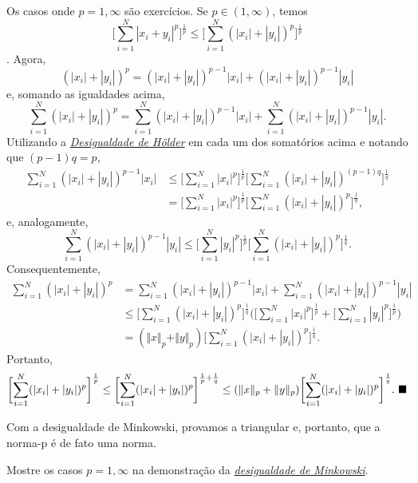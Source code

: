 \documentclass[../functional_analysis.tex]{subfiles}
\begin{document}
\begin{proof*}
	Os casos onde \(p=1, \infty\) são exercícios. Se \(p\in (1, \infty)\), temos
	\[
		\biggl[\sum\limits_{i=1}^{N}|x_{i}+y_{i}|^{p}\biggr]^{\frac{1}{p}} \leq \biggl[\sum\limits_{i=1}^{N}(|x_{i}|+|y_{i}|)^{p}\biggr]^{\frac{1}{p}}
	\].
	Agora,
	\[
		(|x_{i}|+|y_{i}|)^{p} = (|x_{i}|+|y_{i}|)^{p-1}|x_{i}| + (|x_{i}|+|y_{i}|)^{p-1}|y_{i}|
	\]
	e, somando as igualdades acima,
	\[
		\sum\limits_{i=1}^{N}(|x_{i}|+|y_{i}|)^{p} = \sum\limits_{i=1}^{N}(|x_{i}|+|y_{i}|)^{p-1}|x_{i}| + \sum\limits_{i=1}^{N}(|x_{i}|+|y_{i}|)^{p-1}|y_{i}|.
	\]
	Utilizando a \hyperlink{holder_inequality}{\textit{Desigualdade de Hölder}} em cada um dos somatórios acima e notando que \((p-1)q = p\),
	\begin{align*}
		\sum\limits_{i=1}^{N}(|x_{i}|+|y_{i}|)^{p-1}|x_{i}| & \leq \biggl[\sum\limits_{i=1}^{N}|x_{i}|^{p}\biggr]^{\frac{1}{p}}\biggl[\sum\limits_{i=1}^{N}(|x_{i}|+|y_{i}|)^{(p-1)q}\biggr]^{\frac{1}{q}} \\
		                                                    & = \biggl[\sum\limits_{i=1}^{N}|x_{i}|^{p}\biggr]^{\frac{1}{p}}\biggl[\sum\limits_{i=1}^{N}(|x_{i}|+|y_{i}|)^{p}\biggr]^{\frac{1}{q}},
	\end{align*}
	e, analogamente,
	\[
		\sum\limits_{i=1}^{N}(|x_{i}|+|y_{i}|)^{p-1}|y_{i}| \leq \biggl[\sum\limits_{i=1}^{N}|y_{i}|^{p}\biggr]^{\frac{1}{p}}\biggl[\sum\limits_{i=1}^{N}(|x_{i}|+|y_{i}|)^{p}\biggr]^{\frac{1}{q}}.
	\]
	Consequentemente,
	\begin{align*}
		\sum\limits_{i=1}^{N}(|x_{i}|+|y_{i}|)^{p} & = \sum\limits_{i=1}^{N}(|x_{i}|+|y_{i}|)^{p-1}|x_{i}| + \sum\limits_{i=1}^{N}(|x_{i}|+|y_{i}|)^{p-1}|y_{i}|                                                                                                          \\
		                                           & \leq \biggl[\sum\limits_{i=1}^{N}(|x_{i}|+|y_{i}|)^{p}\biggr]^{\frac{1}{q}}\biggl(\biggl[\sum\limits_{i=1}^{N}|x_{i}|^{p}\biggr]^{\frac{1}{p}} + \biggl[\sum\limits_{i=1}^{N}|y_{i}|^{p}\biggr]^{\frac{1}{p}}\biggr) \\
		                                           & = (\Vert x \Vert_p + \Vert y \Vert_p)\biggl[\sum\limits_{i=1}^{N}(|x_{i}|+|y_{i}|)^{p}\biggr]^{\frac{1}{q}}.
	\end{align*}
	Portanto,
	\[
		\biggl[\sum\limits_{i=1}^{N}(|x_{i}|+|y_{i}|)^{p}\biggr]^{\frac{1}{p}} \leq \biggl[\sum\limits_{i=1}^{N}(|x_{i}|+|y_{i}|)^{p}\biggr]^{\frac{1}{p} + \frac{1}{q}} \leq (\Vert x \Vert_p + \Vert y \Vert_p)\biggl[\sum\limits_{i=1}^{N}(|x_{i}|+|y_{i}|)^{p}\biggr]^{\frac{1}{q}}. \text{ $\blacksquare$}
	\]
\end{proof*}
Com a desigualdade de Minkowski, provamos a triangular e, portanto, que a norma-p é de fato uma norma.
\begin{exr}
	Mostre os casos \(p=1, \infty\) na demonstração da \hyperlink{minkowski_inequality}{\textit{desigualdade de Minkowski}}.
\end{exr}
\end{document}
